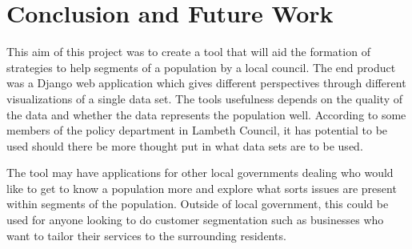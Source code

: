\chapter{Conclusion and Future Work} \label{ch:conclusion}

This aim of this project was to create a tool that will aid the formation of strategies to help segments of a population by a local council. The end product was a Django web application which gives different perspectives through different visualizations of a single data set. The tool\textsc{}s usefulness depends on the quality of the data and whether the data represents the population well. According to some members of the policy department in Lambeth Council, it has potential to be used should there be more thought put in what data sets are to be used.\par

The tool may have applications for other local governments dealing who would like to get to know a population more and explore what sorts issues are present within segments of the population. Outside of local government, this could be used for anyone looking to do customer segmentation such as businesses who want to tailor their services to the surrounding residents.

